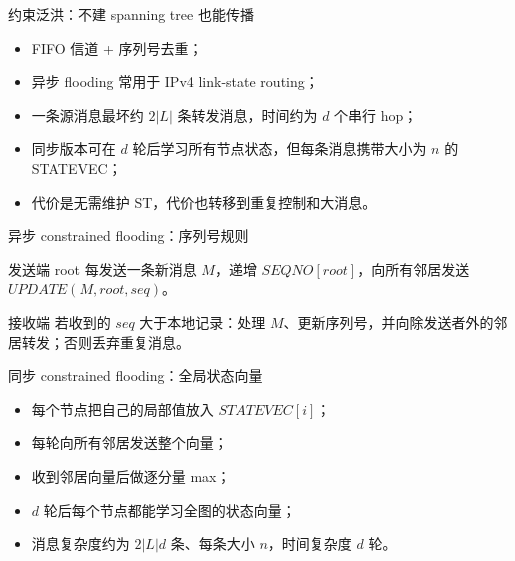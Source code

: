 \documentclass[UTF8,fontset=none,aspectratio=169,10pt]{beamer}
\begin{document}
{\begin{frame}{约束泛洪：不建 spanning tree 也能传播}
\begin{itemize}
  \item FIFO 信道 + 序列号去重；
  \item 异步 flooding 常用于 IPv4 link-state routing；
  \item 一条源消息最坏约 $2|L|$ 条转发消息，时间约为 $d$ 个串行 hop；
  \item 同步版本可在 $d$ 轮后学习所有节点状态，但每条消息携带大小为 $n$ 的 STATEVEC；
  \item 代价是无需维护 ST，代价也转移到重复控制和大消息。
\end{itemize}
\end{frame}

\begin{frame}{异步 constrained flooding：序列号规则}
\scriptsize
\begin{block}{发送端}
root 每发送一条新消息 $M$，递增 $SEQNO[root]$，向所有邻居发送 $UPDATE(M,root,seq)$。
\end{block}
\begin{block}{接收端}
若收到的 $seq$ 大于本地记录：处理 $M$、更新序列号，并向除发送者外的邻居转发；否则丢弃重复消息。
\end{block}
\normalsize
\vfill
{}
\end{frame}

\begin{frame}{同步 constrained flooding：全局状态向量}
\begin{itemize}
  \item 每个节点把自己的局部值放入 $STATEVEC[i]$；
  \item 每轮向所有邻居发送整个向量；
  \item 收到邻居向量后做逐分量 max；
  \item $d$ 轮后每个节点都能学习全图的状态向量；
  \item 消息复杂度约为 $2|L|d$ 条、每条大小 $n$，时间复杂度 $d$ 轮。
\end{itemize}
\end{frame}


}
\end{document}
